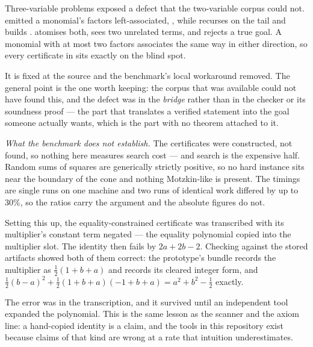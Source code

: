 \begin{remark}
Three-variable problems exposed a defect that the two-variable corpus could not.
 emitted a monomial's factors left-associated,
, while  recurses on the tail and builds
.  atomises both, sees two unrelated terms, and
rejects a true goal. A monomial with at most two factors associates the same way
in either direction, so every certificate in  sits exactly on
the blind spot.

It is fixed at the source and the benchmark's local workaround removed. The
general point is the one worth keeping: the corpus that was available could not
have found this, and the defect was in the \emph{bridge} rather than in the
checker or its soundness proof --- the part that translates a verified statement
into the goal someone actually wants, which is the part with no theorem
attached to it.
\end{remark}

\emph{What the benchmark does not establish.} The certificates were constructed,
not found, so nothing here measures search cost --- and search is the expensive
half. Random sums of squares are generically strictly positive, so no hard
instance sits near the boundary of the cone and nothing Motzkin-like is present.
The timings are single runs on one machine and two runs of identical work
differed by up to 30\%, so the ratios carry the argument and the absolute
figures do not.


\begin{remark}
Setting this up, the equality-constrained certificate was transcribed with its
multiplier's constant term negated --- the equality polynomial copied into the
multiplier slot. The identity then fails by $2a+2b-2$. Checking against the
stored artifacts showed both of them correct: the prototype's bundle records the
multiplier as $\tfrac12(1+b+a)$ and  records its cleared
integer form, and
$\tfrac12(b-a)^2 + \tfrac12(1+b+a)(-1+b+a) = a^2+b^2-\tfrac12$ exactly.

The error was in the transcription, and it survived until an independent tool
expanded the polynomial. This is the same lesson as the  scanner and
the axiom line: a hand-copied identity is a claim, and the tools in this
repository exist because claims of that kind are wrong at a rate that intuition
underestimates.
\end{remark}

